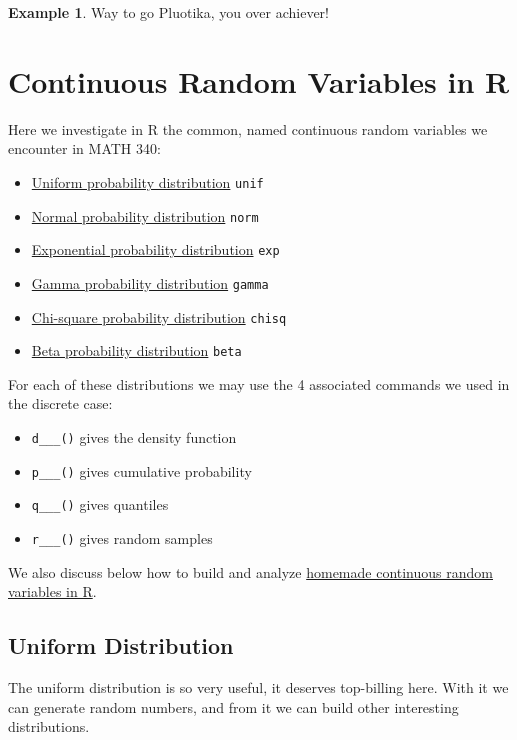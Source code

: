 \documentclass[
]{book}
\providecommand{\tightlist}{%
  \setlength{\itemsep}{0pt}\setlength{\parskip}{0pt}}
\theoremstyle{definition}
\theoremstyle{definition}
\newtheorem{example}{Example}[chapter]
\theoremstyle{definition}
\theoremstyle{definition}
\theoremstyle{remark}
\begin{document}
\begin{example}
Way to go Pluotika, you over achiever!

\end{example}

\chapter{Continuous Random Variables in R}\label{R-continuousRV}

Here we investigate in R the common, named continuous random variables we encounter in MATH 340:

\begin{itemize}
\tightlist
\item
  \hyperref[unifR]{Uniform probability distribution} \textbar{} \texttt{unif}
\item
  \hyperref[normalR]{Normal probability distribution} \textbar{} \texttt{norm}
\item
  \hyperref[expR]{Exponential probability distribution} \textbar{} \texttt{exp}
\item
  \hyperref[gammaR]{Gamma probability distribution} \textbar{} \texttt{gamma}
\item
  \hyperref[chiR]{Chi-square probability distribution} \textbar{} \texttt{chisq}
\item
  \hyperref[betaR]{Beta probability distribution} \textbar{} \texttt{beta}
\end{itemize}

For each of these distributions we may use the 4 associated commands we used in the discrete case:

\begin{itemize}
\tightlist
\item
  \texttt{d\_\_\_()} gives the density function
\item
  \texttt{p\_\_\_()} gives cumulative probability
\item
  \texttt{q\_\_\_()} gives quantiles
\item
  \texttt{r\_\_\_()} gives random samples
\end{itemize}

We also discuss below how to build and analyze \hyperref[custom-continuous-R]{homemade continuous random variables in R}.

\section{Uniform Distribution}\label{unifR}

The uniform distribution is so very useful, it deserves top-billing here. With it we can generate random numbers, and from it we can build other interesting distributions.
\end{document}

